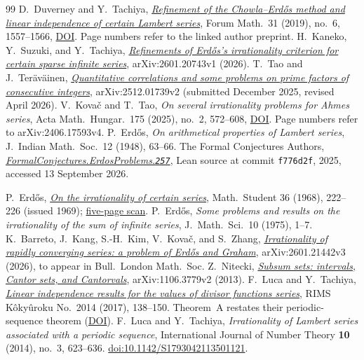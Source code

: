 \documentclass[11pt]{article}
\begin{document}
\begin{thebibliography}{99}
 D.~Duverney and Y.~Tachiya,
  \href{https://danielduverney.fr/documents/theorie-des-nombres/DuverneyTachiya190522.pdf}
  {\emph{Refinement of the Chowla--Erd\H{o}s method and linear independence
  of certain Lambert series}},
  Forum Math.\ 31 (2019), no.~6, 1557--1566,
  \href{https://doi.org/10.1515/forum-2018-0299}{DOI}.  Page numbers refer to
  the linked author preprint.
 H.~Kaneko, Y.~Suzuki, and Y.~Tachiya,
  \href{https://arxiv.org/abs/2601.20743v1}{\emph{Refinements of Erd\H{o}s's
  irrationality criterion for certain sparse infinite series}},
  arXiv:2601.20743v1 (2026).
 T.~Tao and J.~Ter\"av\"ainen,
  \href{https://arxiv.org/abs/2512.01739v2}{\emph{Quantitative correlations and
  some problems on prime factors of consecutive integers}}, arXiv:2512.01739v2
  (submitted December 2025, revised April 2026).
 V.~Kova\v{c} and T.~Tao, \emph{On several irrationality
  problems for Ahmes series}, Acta Math.\ Hungar.\ 175 (2025), no.~2, 572--608,
  \href{https://doi.org/10.1007/s10474-025-01528-0}{DOI}.  Page numbers refer
  to arXiv:2406.17593v4.
 P.~Erd\H{o}s, \emph{On arithmetical properties of Lambert
  series}, J.~Indian Math.\ Soc.\ 12 (1948), 63--66.
 The Formal Conjectures Authors,
  \href{https://github.com/google-deepmind/formal-conjectures/blob/f776d2f2039351b00737ffcafb9d7d7666e1d9af/FormalConjectures/ErdosProblems/257.lean}
  {\emph{FormalConjectures.ErdosProblems.\texttt{257}}},
  Lean source at commit \texttt{f776d2f}, 2025, accessed 13 September 2026.

 P.~Erd\H{o}s,
  \href{https://users.renyi.hu/~p_erdos/1969-09.pdf}{\emph{On the
  irrationality of certain series}}, Math.\ Student 36 (1968), 222--226
  (issued 1969); \href{https://www.renyi.hu/~p_erdos/1969-09.pdf}{five-page scan}.
 P.~Erd\H{o}s, \emph{Some problems and results on the
  irrationality of the sum of infinite series}, J.~Math.\ Sci.\ 10 (1975),
  1--7.
 K.~Barreto, J.~Kang, S.-H.~Kim, V.~Kova\v{c}, and
  S.~Zhang, \href{https://arxiv.org/abs/2601.21442v3}{\emph{Irrationality of
  rapidly converging series: a problem of Erd\H{o}s and Graham}},
  arXiv:2601.21442v3 (2026), to appear in Bull.\ London Math.\ Soc.
 Z.~Nitecki,
  \href{https://arxiv.org/abs/1106.3779v2}{\emph{Subsum sets: intervals, Cantor
  sets, and Cantorvals}}, arXiv:1106.3779v2 (2013).
 F.~Luca and Y.~Tachiya,
  \href{https://www.kurims.kyoto-u.ac.jp/~kyodo/kokyuroku/contents/pdf/2014-14.pdf}
  {\emph{Linear independence results for the values of divisor functions
  series}}, RIMS K\^oky\^uroku No.~2014 (2017), 138--150.
  Theorem~A restates their periodic-sequence theorem
  (\href{https://doi.org/10.1142/S1793042113501121}{DOI}).
F.~Luca and Y.~Tachiya,
\emph{Irrationality of Lambert series associated with a periodic sequence},
International Journal of Number Theory \textbf{10} (2014), no.~3, 623--636.
\href{https://doi.org/10.1142/S1793042113501121}{doi:10.1142/S1793042113501121}.


\end{thebibliography}
\end{document}
